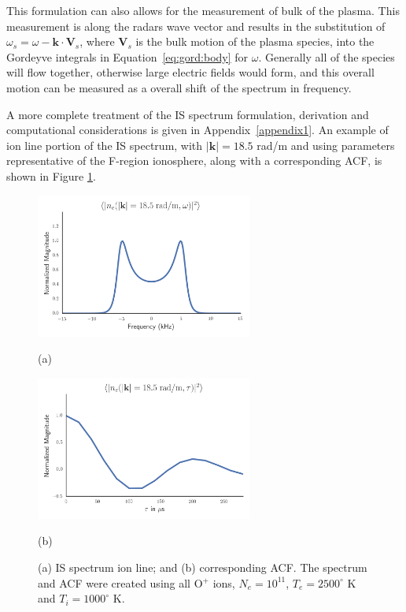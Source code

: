 This formulation can also allows for the measurement of bulk of the plasma. This measurement is along the radars wave vector and results in the substitution of $\omega_s=\omega-\mathbf{k}\cdot\mathbf{V}_s$, where $\mathbf{V}_s$ is the bulk motion of the plasma species, into the Gordeyve integrals in Equation~\ref{eq:gord:body} for $\omega$. Generally all of the species will flow together, otherwise large electric fields would form, and this overall motion can be measured as a overall shift of the spectrum in frequency.

A more complete treatment of the IS spectrum formulation, derivation and computational considerations is given in Appendix~\ref{appendix1}. An example of ion line portion of the IS spectrum, with  $|\mathbf{k}|=18.5$ rad/m and using parameters representative of the F-region ionosphere, along with a corresponding ACF, is shown in Figure \ref{fig:ispecch2}. 

\begin{figure}[htb]
  \begin{minipage}[t]{0.49\linewidth}\centering
    \includegraphics[width=2.8in]{Specion}
    \medskip
    \centerline{(a)}
  \end{minipage}\hfill
  \begin{minipage}[t]{0.49\linewidth}\centering
    \includegraphics[width=2.8in]{acfion}
    \medskip
    \centerline{(b)}
  \end{minipage}
  \caption{(a) IS spectrum ion line; and (b) corresponding ACF. The spectrum and ACF were created using all O$^+$ ions, $N_e = 10^{11}$, $T_e=2500 ^\circ$ K and $T_i=1000 ^\circ$ K.}
  \label{fig:ispecch2}
\end{figure}

